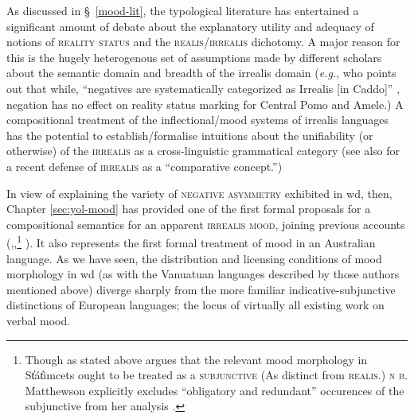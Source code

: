 %
%
%




As discussed in \S~\ref{mood-lit}, the typological literature has entertained a significant amount of debate about the explanatory utility and adequacy of notions of \textsc{reality status} and the \textsc{realis/irrealis} dichotomy. A major reason for this is the hugely heterogenous set of assumptions made by different scholars about the semantic domain and breadth of the irrealis domain (\textit{e.g.}, \citeauthor{Mithun1995} who points out that while, ``negatives are systematically categorized as Irrealis [in Caddo]'' \citeyearpar[380]{Mithun1995}, negation has no effect on reality status marking for Central Pomo and Amele.) A compositional treatment of the inflectional/mood systems of irrealis languages has the potential to establish/formalise intuitions about the unifiability (or otherwise) of the \textsc{irrealis} as a cross-linguistic grammatical category (see also \citeauthor{VonPrincea} for a recent defense of \textsc{irrealis} as a ``comparative concept.'')

In view of explaining the variety of \textsc{negative asymmetry} exhibited in \gls{wd}, then, Chapter \ref{sec:yol-mood} has provided one of the first formal proposals for a compositional semantics for an apparent \textsc{irrealis mood}, joining previous accounts (\citealp[\textit{e.g.},][]{Krifka2016},\citealp{Matthewson2010},\footnote{Though as stated above \citet[13]{Matthewson2010} argues that the relevant mood morphology in  St̓át̓imcets ought to be treated as a \textsc{subjunctive} (As distinct from \textsc{realis}.) \textsc{n\kern -2pt b.} Matthewson explicitly excludes ``obligatory and redundant'' occurences of the subjunctive from her analysis \citeyearpar[26]{Matthewson2010}.} \citealp{VonPrince2018}). It also represents the first formal treatment of mood in an Australian language. As we have seen, the distribution and licensing conditions of mood morphology in \gls{wd} (as with the Vanuatuan languages described by those authors mentioned above) diverge sharply from the more familiar indicative-subjunctive distinctions of European languages; the locus of virtually all existing work on verbal mood. 


